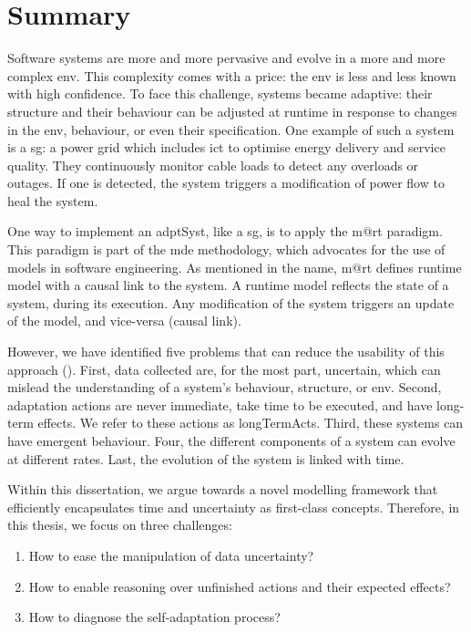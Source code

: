 \section{Summary}

Software systems are more and more pervasive and evolve in a more and more complex \gls{env}.
This complexity comes with a price: the \gls{env} is less and less known with high confidence.
To face this challenge, systems became adaptive: their \gls{structure} and their \gls{behaviour} can be adjusted at runtime in response to changes in the \gls{env}, \gls{behaviour}, or even their specification.
One example of such a system is a \gls{sg}: a power grid which includes \gls{ict} to optimise energy delivery and service quality.
They continuously monitor cable loads to detect any overloads or outages.
If one is detected, the system triggers a modification of power flow to heal the system.

One way to implement an \gls{adptSyst}, like a \gls{sg}, is to apply the \gls{m@rt} paradigm.
This paradigm is part of the \gls{mde} methodology, which advocates for the use of \glspl{model} in software engineering.
As mentioned in the name, \gls{m@rt} defines runtime \gls{model} with a causal link to the system.
A runtime \gls{model} reflects the state of a system, during its execution.
Any modification of the system triggers an update of the \gls{model}, and vice-versa (causal link).

However, we have identified five problems that can reduce the usability of this approach (\cf {}).
First, data collected are, for the most part, uncertain, which can mislead the understanding of a system's \gls{behaviour}, \gls{structure}, or \gls{env}.
Second, adaptation \glspl{action} are never immediate, take time to be executed, and have long-term effects.
We refer to these \glspl{action} as \glspl{longTermAct}.
Third, these systems can have emergent \gls{behaviour}.
Four, the different components of a system can evolve at different rates.
Last, the evolution of the system is linked with time.

Within this dissertation, we argue towards a novel modelling framework that efficiently encapsulates time and uncertainty as first-class concepts.
Therefore, in this thesis, we focus on three challenges:
\begin{enumerate}
	\vspace{-0.5em}
	\setlength\itemsep{-0.3em}
	\item How to ease the manipulation of data uncertainty?
	\item How to enable reasoning over unfinished actions and their expected effects?
	\item How to diagnose the self-adaptation process?
\end{enumerate}

